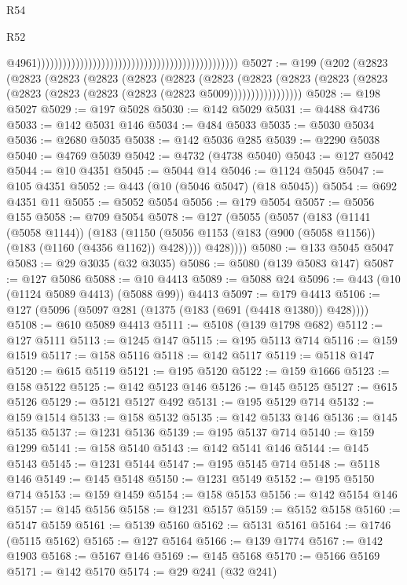 \begin{lexlean}{R54}
\begin{lexlean}{R52}
\begin{coremodule}
{{{{{{{{{{{{{{{{{{{{{{{{{{{{{{{{{{{{{{{{{{{{{{{{{{{{{{{{{{{{{{{{{{{{{{{{{{{{{{{{{{{{{{{{{{{{{{{{{{{{{{{{{{{{{{{{{{{{{{{{{{{{{{{{{{{{{{{{{{{{{{{{{{{{{{{{{{{{{{{{{{{{{{{{{{{{{{{{{{{{{{{{{{{{{{{{{{{{{{                                                                                                  @4961)))))))))))))))))))))))))))))))))))))))))))))))
@5027 := @199
    (@202
      (@2823
        (@2823
          (@2823
            (@2823
              (@2823
                (@2823
                  (@2823
                    (@2823
                      (@2823 (@2823 (@2823 (@2823 (@2823 (@2823 (@2823 (@2823 @5009)))))))))))))))))
@5028 := @198 @5027
@5029 := @197 @5028
@5030 := @142 @5029
@5031 := @4488 @4736
@5033 := @142 @5031 @146
@5034 := @484 @5033
@5035 := @5030 @5034
@5036 := @2680 @5035
@5038 := @142 @5036 @285
@5039 := @2290 @5038
@5040 := @4769 @5039
@5042 := @4732 (@4738 @5040)
@5043 := @127 @5042
@5044 := @10 @4351
@5045 := @5044 @14
@5046 := @1124 @5045
@5047 := @105 @4351
@5052 := @443 (@10 (@5046 @5047) (@18 @5045))
@5054 := @692 @4351 @11
@5055 := @5052 @5054
@5056 := @179 @5054
@5057 := @5056 @155
@5058 := @709 @5054
@5078 := @127
    (@5055
      (@5057
        (@183
          (@1141 (@5058 @1144))
          (@183
            (@1150 (@5056 @1153 (@183 (@900 (@5058 @1156)) (@183 (@1160 (@4356 @1162)) @428))))
            @428))))
@5080 := @133 @5045 @5047
@5083 := @29 @3035 (@32 @3035)
@5086 := @5080 (@139 @5083 @147)
@5087 := @127 @5086
@5088 := @10 @4413
@5089 := @5088 @24
@5096 := @443 (@10 (@1124 @5089 @4413) (@5088 @99)) @4413
@5097 := @179 @4413
@5106 := @127 (@5096 (@5097 @281 (@1375 (@183 (@691 (@4418 @1380)) @428))))
@5108 := @610 @5089 @4413
@5111 := @5108 (@139 @1798 @682)
@5112 := @127 @5111
@5113 := @1245 @147
@5115 := @195 @5113 @714
@5116 := @159 @1519
@5117 := @158 @5116
@5118 := @142 @5117
@5119 := @5118 @147
@5120 := @615 @5119
@5121 := @195 @5120
@5122 := @159 @1666
@5123 := @158 @5122
@5125 := @142 @5123 @146
@5126 := @145 @5125
@5127 := @615 @5126
@5129 := @5121 @5127 @492
@5131 := @195 @5129 @714
@5132 := @159 @1514
@5133 := @158 @5132
@5135 := @142 @5133 @146
@5136 := @145 @5135
@5137 := @1231 @5136
@5139 := @195 @5137 @714
@5140 := @159 @1299
@5141 := @158 @5140
@5143 := @142 @5141 @146
@5144 := @145 @5143
@5145 := @1231 @5144
@5147 := @195 @5145 @714
@5148 := @5118 @146
@5149 := @145 @5148
@5150 := @1231 @5149
@5152 := @195 @5150 @714
@5153 := @159 @1459
@5154 := @158 @5153
@5156 := @142 @5154 @146
@5157 := @145 @5156
@5158 := @1231 @5157
@5159 := @5152 @5158
@5160 := @5147 @5159
@5161 := @5139 @5160
@5162 := @5131 @5161
@5164 := @1746 (@5115 @5162)
@5165 := @127 @5164
@5166 := @139 @1774
@5167 := @142 @1903
@5168 := @5167 @146
@5169 := @145 @5168
@5170 := @5166 @5169
@5171 := @142 @5170
@5174 := @29 @241 (@32 @241)
}}}}}}}}}}}}}}}}}}}}}}}}}}}}}}}}}}}}}}}}}}}}}}}}}}}}}}}}}}}}}}}}}}}}}}}}}}}}}}}}}}}}}}}}}}}}}}}}}}}}}}}}}}}}}}}}}}}}}}}}}}}}}}}}}}}}}}}}}}}}}}}}}}}}}}}}}}}}}}}}}}}}}}}}}}}}}}}}}}}}}}}}}}}}}}}}}}}}}}
\end{coremodule}
\end{lexlean}
\end{lexlean}
